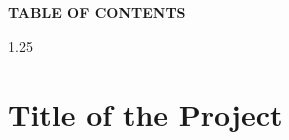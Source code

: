 \documentclass[12pt,a4paper]{article}
\begin{document}
\vfill

\vspace*{0.4in}



\newpage

\vspace*{0.25in}

\begin{center}
{\fontsize{18}{22}\selectfont
\textbf{TABLE OF CONTENTS}
}
\end{center}

\vspace{0.25in}

\renewcommand{\contentsname}{}

\begin{spacing}{1.25}
\tableofcontents
\end{spacing}



\newpage

\setcounter{page}{5}



\section{Title of the Project}

\vspace{0.10in}
\end{document}
